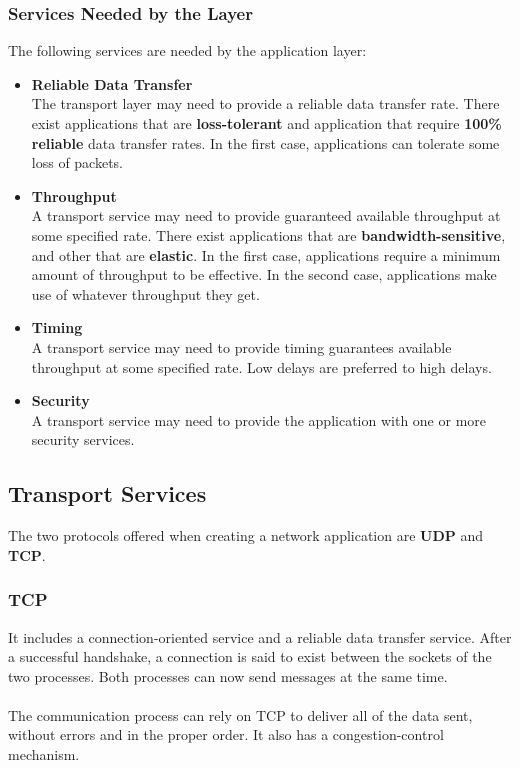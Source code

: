 \documentclass{article}
\begin{document}
\subsubsection{Services Needed by the Layer}
The following services are needed by the application layer:

\begin{itemize}
	\item \textbf{Reliable Data Transfer}
	\vspace{.2cm} \\
	The transport layer may need to provide a reliable data transfer rate. There exist applications that are \textbf{loss-tolerant} and application that require \textbf{100\% reliable} data transfer rates. In the first case, applications can tolerate some loss of packets.
	
	\item \textbf{Throughput}
	\vspace{.2cm} \\
	A transport service may need to provide guaranteed available throughput at some specified rate. There exist applications that are \textbf{bandwidth-sensitive}, and other that are \textbf{elastic}. In the first case, applications require a minimum amount of throughput to be effective. In the second case, applications make use of whatever throughput they get.
	
	\item \textbf{Timing}
	\vspace{.2cm} \\
	A transport service may need to provide timing guarantees available throughput at some specified rate. Low delays are preferred to high delays.
	
	\item \textbf{Security}
	\vspace{.2cm} \\
	A transport service may need to provide the application with one or more security services.
\end{itemize}

\subsection{Transport Services}
The two protocols offered when creating a network application are \textbf{UDP} and \textbf{TCP}.

\subsubsection{TCP}
It includes a connection-oriented service and a reliable data transfer service. After a successful handshake, a connection is said to exist between the sockets of the two processes. Both processes can now send messages at the same time. \\ \\
The communication process can rely on TCP to deliver all of the data sent, without errors and in the proper order. It also has a congestion-control mechanism.
\end{document}
